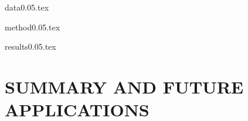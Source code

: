 \documentclass[useAMS,usenatbib]{mn2e}
\begin{document}
{data0.05.tex}


{method0.05.tex}

{results0.05.tex}
\section{SUMMARY AND FUTURE APPLICATIONS}
\label{sec: summary}

\end{document}
